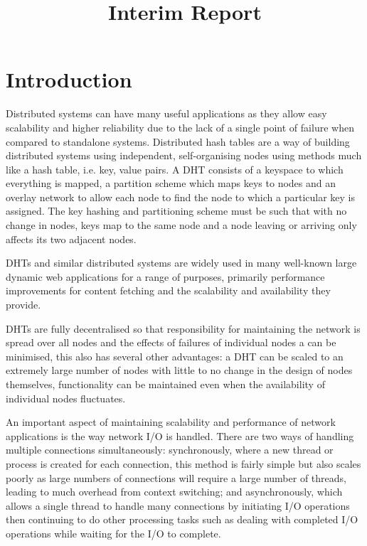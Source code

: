 \documentclass{article}
\begin{document}
\title{Interim Report}
\maketitle
\section{Introduction}
Distributed systems can have many useful applications as they allow easy scalability and higher reliability due to the lack of a single point of failure when compared to standalone systems. Distributed hash tables are a way of building distributed systems using independent, self-organising nodes using methods much like a hash table, i.e. key, value pairs.  A DHT consists of a keyspace to which everything is mapped, a partition scheme which maps keys to nodes and an overlay network to allow each node to find the node to which a particular key is assigned. The key hashing and partitioning scheme must be such that with no change in nodes, keys map to the same node and a node leaving or arriving only affects its two adjacent nodes.

DHTs and similar distributed systems are widely used in many well-known large dynamic web applications for a range of purposes, primarily performance improvements for content fetching and the scalability and availability they provide.

DHTs are fully decentralised so that responsibility for maintaining the network is spread over all nodes and the effects of failures of individual nodes a can be minimised, this also has several other advantages: a DHT can be scaled to an extremely large number of nodes with little to no change in the design of nodes themselves, functionality can be maintained even when the availability of individual nodes fluctuates.

An important aspect of maintaining scalability and performance of network applications is the way network I/O is handled. There are two ways of handling multiple connections simultaneously: synchronously, where a new thread or process is created for each connection, this method is fairly simple but also scales poorly as large numbers of connections will require a large number of threads, leading to much overhead from context switching; and asynchronously, which allows a single thread to handle many connections by initiating I/O operations then continuing to do other processing tasks such as dealing with completed I/O operations while waiting for the I/O to complete.
\end{document}
